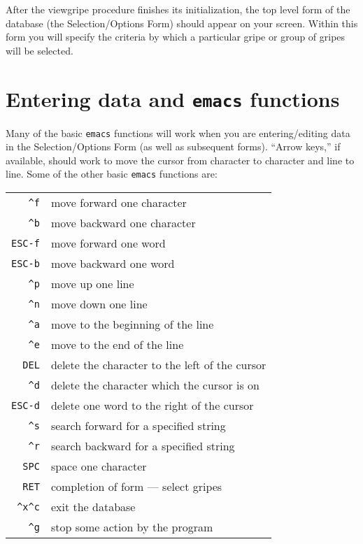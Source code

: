 After the viewgripe procedure finishes its initialization, the top
level form of the database (the Selection/Options Form) should appear
on your screen.  Within this form you will specify the criteria by
which a particular gripe or group of gripes will be selected.

\section{Entering data and {\tt emacs} functions}

Many of the basic {\tt emacs} functions will work when you are
entering/editing data in the Selection/Options Form (as well as
subsequent forms).  ``Arrow keys,'' if available, should work to move
the cursor from character to character and line to line.  Some of the
other basic {\tt emacs} functions are:
\begin{center}
\begin{tabular}{rl}
{\tt \^{ }f}    & move forward one character \\
{\tt \^{ }b}    & move backward one character \\
{\tt ESC-f}  & move forward one word \\
{\tt ESC-b}  & move backward one word \\
{\tt \^{ }p}    & move up one line \\
{\tt \^{ }n}    & move down one line \\
{\tt \^{ }a}    & move to the beginning of the line \\
{\tt \^{ }e}    & move to the end of the line \\
{\tt DEL}    & delete the character to  the left of the cursor \\
{\tt \^{ }d}    & delete the character which the cursor is on \\
{\tt ESC-d}  & delete one word to the right of the cursor \\
{\tt \^{ }s}    & search forward for a specified string \\
{\tt \^{ }r}    & search backward for a specified string \\
{\tt SPC}    & space one character \\
{\tt RET}    & completion of form --- select gripes \\
{\tt \^{ }x\^{ }c} & exit the database \\
{\tt \^{ }g}    & stop some action by the program
\end{tabular}
\end{center}

